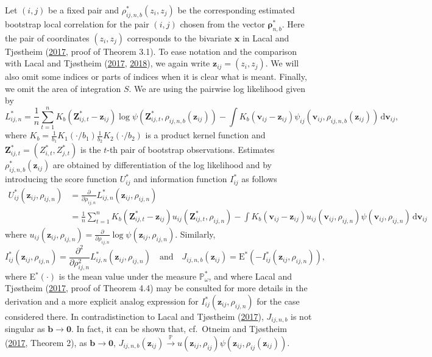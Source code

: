 \documentclass[
  12pt,
  letterpaper]{article}
\numberwithin{equation}{section}
\newcommand{\x}{\bm{x}}
\newcommand{\Z}{\bm{Z}}
\newcommand{\z}{\bm{z}}
\newcommand{\fv}{\bm{v}}
\newcommand{\frho}{\bm{\rho}}
\newcommand{\bb}{\bm{b}}
\newcommand{\E}{\textrm{E}}
\newcommand{\di}{\,\textrm{d}}
\begin{document}
Let \((i,j)\) be a fixed pair and \(\rho_{ij,n,b}^*(z_i,z_j)\) be the corresponding estimated bootstrap local correlation for the pair \((i,j)\) chosen from the vector \(\frho_{n,b}^*\). Here the pair of coordinates \((z_i,z_j)\) corresponds to the bivariate \(\x\) in Lacal and Tjøstheim (\protect\hyperlink{ref-lacal2017local}{2017}, proof of Theorem 3.1). To ease notation and the comparison with Lacal and Tjøstheim (\protect\hyperlink{ref-lacal2017local}{2017}, \protect\hyperlink{ref-lacal2018estimating}{2018}), we again write \(\z_{ij} = (z_i,z_j)\). We will also omit some indices or parts of indices when it is clear what is meant. Finally, we omit the area of integration \(S\). We are using the pairwise log likelihood given by
\[
L_{ij,n}^* = \frac{1}{n} \sum_{t=1}^{n} K_b(\Z_{ij,t}^{*}-\z_{ij}) \log \psi(\Z_{ij,t}^{*},\rho_{ij,n,b}(\z_{ij})) - \int K_b(\fv_{ij}-\z_{ij}) \psi_{ij}(\fv_{ij},\rho_{ij,n,b}(\z_{ij})) \di \fv_{ij},
\]
where \(K_b = \frac{1}{b_1}K_1(\cdot/b_1) \frac{1}{b_2} K_2(\cdot/b_2)\) is a product kernel function and \(\Z_{ij,t}^{*} = \left(Z_{i,t}^{*},Z_{j,t}^{*}\right)\) is the \(t\)-th pair of bootstrap observations. Estimates \(\rho_{ij,n,b}^*(\z_{ij})\) are obtained by differentiation of the log likelihood and by introducing the score function \(U_{ij}^*\) and information function \(I_{ij}^*\) as follows
\begin{align*}
U_{ij}^*(\z_{ij},\rho_{ij,n}) &= \frac{\partial}{\partial \rho_{ij,n}}L_{ij,n}^*(\z_{ij},\rho_{ij,n}) \\
& = \frac{1}{n}\sum_{t=1}^{n}K_b(\Z_{ij,t}^{*} - \z_{ij})u_{ij}(\Z_{ij,t}^{*},\rho_{ij,n}) - 
\int K_b(\fv_{ij} - \z_{ij})u_{ij}(\fv_{ij},\rho_{ij,n})\psi(\fv_{ij},\rho_{ij,n}) \di \fv_{ij}
\end{align*}
where \(u_{ij}(\z_{ij},\rho_{ij,n}) = \frac{\partial}{\partial \rho_{ij,n}}\log \psi(\z_{ij},\rho_{ij,n})\). Similarly,
\[
I_{ij}^*(\z_{ij},\rho_{ij,n}) = \frac{\partial^2}{\partial \rho_{ij,n}^2} L_{ij,n}^{*}(\z_{ij},\rho_{ij,n}) \quad \mbox{and} \quad J_{ij,n,b}(\z_{ij}) = \E^*\left(-I_{ij}^*(\z_{ij},\rho_{ij,n})\right),
\]
where E\(^*(\cdot)\) is the mean value under the measure \(\mathbb{P}^*_{\omega}\), and where Lacal and Tjøstheim (\protect\hyperlink{ref-lacal2017local}{2017}, proof of Theorem 4.4) may be consulted for more details in the derivation and a more explicit analog expression for \(I_{ij}^*(\z_{ij},\rho_{ij,n})\) for the case considered there. In contradistinction to Lacal and Tjøstheim (\protect\hyperlink{ref-lacal2017local}{2017}), \(J_{ij,n,b}\) is not singular as \(\bb \to \bm{0}\). In fact, it can be shown that, cf.~Otneim and Tjøstheim (\protect\hyperlink{ref-otneim2017locally}{2017}, Theorem 2), as \(\bb \to \bm{0}\), \(J_{ij,n,b}(\z_{ij}) \stackrel{\mathbb{P}}{\to} u(\z_{ij},\rho_{ij})\psi(\z_{ij},\rho_{ij}(\z_{ij}))\).
\end{document}
